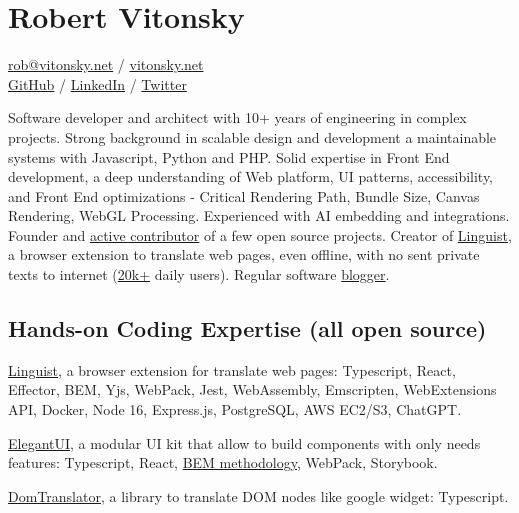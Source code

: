 \documentclass{vitonsky}
\begin{document}
\vitonskyPrintPhoto{}

\section*{\Large{Robert Vitonsky}}

\href{mailto:rob@vitonsky.net}{rob@vitonsky.net} / \href{https://vitonsky.net}{vitonsky.net}\\%
\href{https://github.com/vitonsky}{GitHub} /
\href{https://www.linkedin.com/in/vitonsky}{LinkedIn} /
\href{https://twitter.com/intent/follow?screen_name=rvitonsky}{Twitter}

\vspace*{12pt}

Software developer and architect with 10+ years of engineering in complex projects. Strong background in scalable design and development a maintainable systems with Javascript, Python and PHP. Solid expertise in Front End development, a deep understanding of Web platform, UI patterns, accessibility, and Front End optimizations - Critical Rendering Path, Bundle Size, Canvas Rendering, WebGL Processing. Experienced with AI embedding and integrations. Founder and \href{https://github.com/vitonsky}{active contributor} of a few open source projects. Creator of \href{https://github.com/translate-tools/linguist}{Linguist}, a browser extension to translate web pages, even offline, with no sent private texts to internet (\href{https://github.com/translate-tools/linguist}{20k+} daily users). Regular software \href{https://vitonsky.net/}{blogger}.

\subsection*{Hands-on Coding Expertise (all open source)}

\href{https://github.com/translate-tools/linguist}{Linguist}, a browser
extension for translate web pages: Typescript, React, Effector, BEM,
Yjs, WebPack, Jest, WebAssembly, Emscripten, WebExtensions API, Docker,
Node 16, Express.js, PostgreSQL, AWS EC2/S3, ChatGPT.

\href{https://github.com/vitonsky/react-elegant-ui}{ElegantUI}, a
modular UI kit that allow to build components with only needs features:
Typescript, React, \href{https://en.bem.info/methodology/quick-start/}{BEM methodology},
WebPack, Storybook.

\href{https://github.com/translate-tools/domtranslator}{DomTranslator}, a library to translate DOM nodes like google widget: Typescript.
\end{document}
